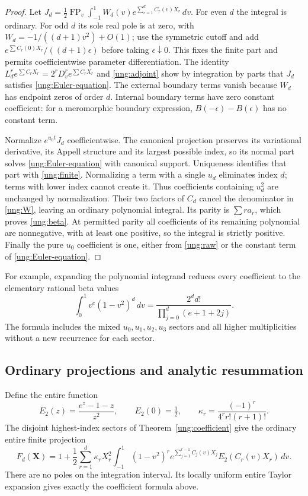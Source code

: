 \begin{proof}
Let $J_d=\frac12\operatorname{FP}_v\int_{-1}^1
W_d(v)e^{\sum_{r=1}^dC_r(v)X_r}\,dv$.
For even $d$ the integral is ordinary. For odd $d$ its sole real
pole is at zero, with $W_d=-1/((d+1)v^2)+O(1)$; use the symmetric
cutoff and add $e^{\sum C_r(0)X_r}/((d+1)\epsilon)$ before taking
$\epsilon\downarrow0$. This fixes the finite part and permits
coefficientwise parameter differentiation.
The identity $L_d^re^{\sum C_rX_r}=2^rD_v^re^{\sum C_rX_r}$ and
\eqref{ung:adjoint} show by integration by parts that $J_d$ satisfies
\eqref{ung:Euler-equation}. The external boundary terms vanish because
$W_d$ has endpoint zeros of order $d$. Internal boundary terms have
zero constant coefficient: for a meromorphic boundary expression,
$B(-\epsilon)-B(\epsilon)$ has no constant term.

Normalize $e^{u_0t}J_d$ coefficientwise. The canonical projection
preserves its variational derivative, its Appell structure and its
largest possible index, so its normal part solves
\eqref{ung:Euler-equation} with canonical support. Uniqueness identifies
that part with \eqref{ung:finite}. Normalizing a term with a single
$u_d$ eliminates index $d$; terms with lower index cannot create it.
Thus coefficients containing $u_d^2$ are unchanged by normalization.
Their two factors of $C_d$ cancel the denominator in \eqref{ung:W},
leaving an ordinary polynomial integral. Its parity is $\sum r a_r$,
which proves \eqref{ung:beta}. At permitted parity all coefficients
of its remaining polynomial are nonnegative, with at least one positive,
so the integral is strictly positive. Finally the pure $u_0$ coefficient
is one, either from \eqref{ung:raw} or the constant term of
\eqref{ung:Euler-equation}.
\end{proof}

For example, expanding the polynomial integrand reduces every
coefficient to the elementary rational beta values
\[
 \int_0^1v^e(1-v^2)^d\,dv
 =\frac{2^dd!}{\prod_{j=0}^d(e+1+2j)}.
\]
The formula includes the mixed $u_0,u_1,u_2,u_3$ sectors and all
higher multiplicities without a new recurrence for each sector.

\subsection{Ordinary projections and analytic resummation}

Define the entire function
\[
 E_2(z)=\frac{e^z-1-z}{z^2},\qquad E_2(0)=\tfrac12,
 \qquad \kappa_r=\frac{(-1)^r}{4^r r!(r+1)!}.
\]
The disjoint highest-index sectors of Theorem~\ref{ung:coefficient}
give the ordinary entire finite projection
\begin{equation}\label{ung:ordinary-projection}
 F_d(\mathbf X)=1+\frac12\sum_{r=1}^d\kappa_rX_r^2
 \int_{-1}^1(1-v^2)^r
       e^{\sum_{j=1}^{r-1}C_j(v)X_j}E_2(C_r(v)X_r)\,dv.
\end{equation}
There are no poles on the integration interval. Its locally uniform
entire Taylor expansion gives exactly the coefficient formula above.

